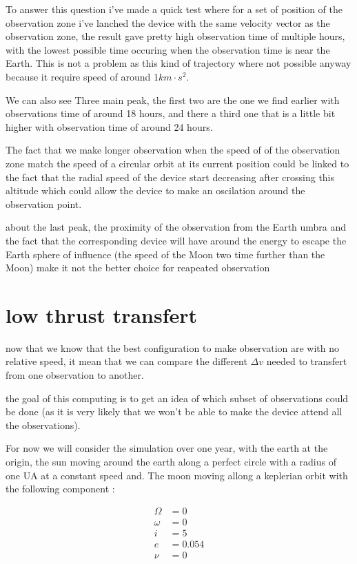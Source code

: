 \documentclass{article} %
\begin{document}
		To answer this question i've made a quick test where for a set of position of the observation zone i've lanched the device with the same velocity vector as the observation zone, the result gave pretty high observation time of multiple hours, with the lowest possible time occuring when the observation time is near the Earth. This is not a problem as this kind of trajectory where not possible anyway because it require speed of around $1 km\cdot s^2$.
		
		We can also see Three main peak, the first two are the one we find earlier with observations time of around 18 hours, and there a third one that is a little bit higher with observation time of around 24 hours.
		
		The fact that we make longer observation when the speed of of the observation zone match the speed of a circular orbit at its current position could be linked to the fact that the radial speed of the device start decreasing after crossing this altitude which could allow the device to make an oscilation around the observation point.
		
		about the last peak, the proximity of the observation from the Earth umbra and the fact that the corresponding device will have around the energy to escape the Earth sphere of influence (the speed of the Moon two time further than the Moon) make it not the better choice for reapeated observation
		
		\section{low thrust transfert}

		now that we know that the best configuration to make observation are with no relative speed, it mean that we can compare the different $\Delta v$ needed to transfert from one observation to another.
		
		the goal of this computing is to get an idea of which subset of observations could be done (as it is very likely that we won't be able to make the device attend all the observations).
		
		For now we will consider the simulation over one year, with the earth at the origin, the sun moving around the earth along a perfect circle with a radius of one UA at a constant speed and. The moon moving allong a keplerian orbit with the following component :
		
		$$
		\begin{align}
			\Omega&=0\\
			\omega&=0\\
			i&=5\\
			e&=0.054\\
			\nu&=0\\
		\end{align}
		$$
		
\end{document}
